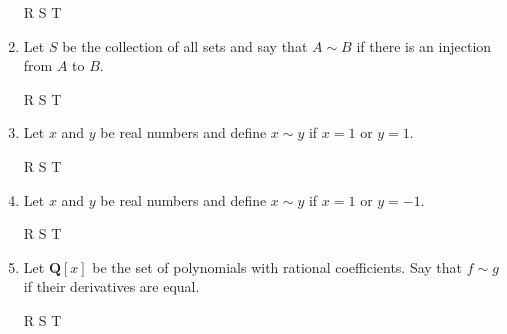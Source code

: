 \documentclass[12pt, reqno]{amsart}
\begin{document}
\begin{enumerate}
\vspace{.4cm}
  \hspace{.4cm} R \hspace{.4cm} S \hspace{.4cm} T
\vspace{.9cm}

\item Let $S$ be the collection of all sets and say that $A \sim
  B$ if there is an injection from $A$ to $B$.





\vspace{.4cm}
  \hspace{.4cm} R \hspace{.4cm} S \hspace{.4cm} T
\vspace{.9cm}



\item Let $x$ and $y$ be real numbers and define $x \sim y$ if $x
  = 1$ or $y = 1$.


\vspace{.4cm}
  \hspace{.4cm} R \hspace{.4cm} S \hspace{.4cm} T
\vspace{.9cm}

\item Let $x$ and $y$ be real numbers and define $x \sim y$ if $x
  = 1$ or $y = -1$.


\vspace{.4cm}
  \hspace{.4cm} R \hspace{.4cm} S \hspace{.4cm} T
\vspace{.9cm}

\item Let $\mathbf{Q}[x]$ be the set of polynomials with rational
  coefficients. Say that $f \sim g$ if their derivatives are equal.


\vspace{.4cm}
  \hspace{.4cm} R \hspace{.4cm} S \hspace{.4cm} T
\vspace{.9cm}
\end{enumerate}
\end{document}
